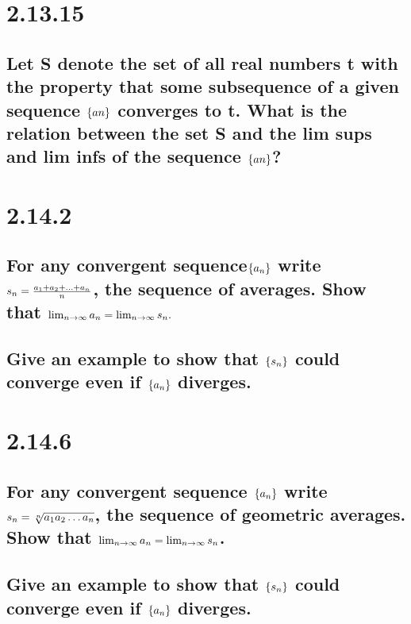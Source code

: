\documentclass[11pt]{article}
\begin{document}
	\section*{2.13.15} 
	\subsection*{Let S denote the set of all real numbers t with the property that some subsequence of a given sequence $\{an\}$ converges to t. What is the relation between the set S and the lim sups and lim infs of the sequence $\{an\}$?}
	
	
	\section*{2.14.2} 
	\subsection*{For any convergent sequence$\{a_n\}$ write $s_n = \frac{a_1 + a_2 + \dots + a_n}{n}$, the sequence of averages. Show that $\lim_{n \to \infty}a_n = \lim_{n \to \infty}s_n.$}
	
	
	\subsection*{Give an example to show that $\{s_n\}$ could converge even if $\{a_n\}$ diverges.}
	
	\section*{2.14.6}
	\subsection*{For any convergent sequence $\{a_n\}$ write $s_n = \sqrt[n]{a_1a_2 \dots a_n}$, the sequence of geometric averages. Show that $\lim_{n \to \infty}a_n = \lim_{n \to \infty}s_n$.}
	
	\subsection*{Give an example to show that	$\{s_n\}$ could converge even if $\{a_n\}$ diverges.}
	
	
	
	
\end{document}
